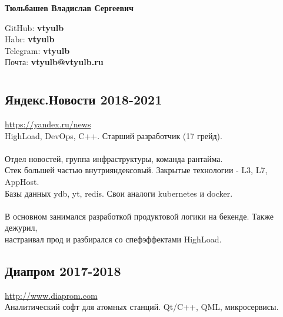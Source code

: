 \documentclass[a4paper, 12pt]{article}
\begin{document}
\begin{center}
    \huge\textbf{Тюльбашев Владислав Сергеевич}\\
\end{center}
\null\hfill GitHub: \textbf{vtyulb} \\
\null\hfill Habr: \textbf{vtyulb} \\
\null\hfill Telegram: \textbf{vtyulb} \\
\null\hfill Почта: \textbf{vtyulb@vtyulb.ru} \\

\section*{} {
    \subsection*{Яндекс.Новости 2018-2021} {
        \href{https://yandex.ru/news}{https://yandex.ru/news} \\
        HighLoad, DevOps, C++. Старший разработчик (17 грейд). \\ \\
        Отдел новостей, группа инфраструктуры, команда рантайма. \\
        Стек большей частью внутрияндексовый. Закрытые технологии - L3, L7, AppHost. \\
        Базы данных ydb, yt, redis. Свои аналоги kubernetes и docker. \\ \\
        В основном занимался разработкой продуктовой логики на бекенде. Также дежурил, \\
        настраивал прод и разбирался со спефэффектами HighLoad.
    }
        
    \subsection*{Диапром 2017-2018} {
        \href{http://www.diaprom.com/}{http://www.diaprom.com} \\
        Аналитический софт для атомных станций. Qt/C++, QML, микросервисы.
    }
    
}
\end{document}
